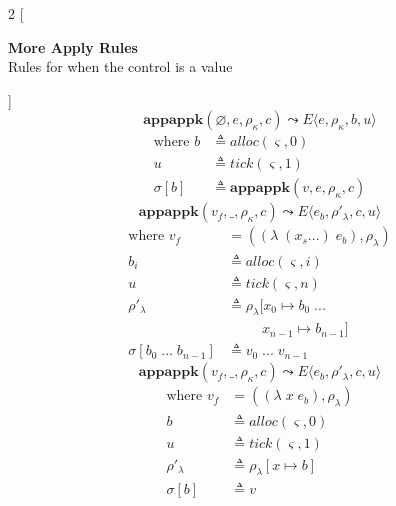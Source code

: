 \documentclass[12pt,draft]{article}
\newcommand{\lamsyn}[2]{(\lambda\;(#1 ...)\;#2)}
\newcommand{\vararglamsyn}[2]{(\lambda\;#1\;#2)}
\begin{document}

\begin{multicols*}{2}
[
\begin{center}
\textbf{More Apply Rules} \\
Rules for when the control is a value
\end{center}
]
\[
\textbf{appappk}(\varnothing, e, \rho_{\kappa}, c)
\leadsto
E\langle
e , \rho_{\kappa} , b , u
\rangle
\]
\vspace{-13mm}
\begin{align*}
\text{where } b &\triangleq alloc(\varsigma, 0) \\
u &\triangleq tick(\varsigma, 1) \\
\sigma[b] &\triangleq \textbf{appappk}(v, e, \rho_{\kappa}, c)
\end{align*}
\[
\textbf{appappk}(v_f,\_, \rho_{\kappa}, c)
\leadsto
E\langle
e_b , \rho'_{\lambda} , c , u
\rangle
\]
\vspace{-11mm}
\begin{align*}
\text{where } v_f &= (\lamsyn{x_s}{e_b}, \rho_{\lambda}) \\
b_i &\triangleq alloc(\varsigma, i) \\
u &\triangleq tick(\varsigma, n) \\
\rho'_{\lambda} &\triangleq \rho_{\lambda}[x_0 \mapsto b_0\; ... \\
&\;\;\;\;\;\;\;\;\;x_{n-1} \mapsto b_{n-1}] \\
\sigma[b_0\;...\; b_{n-1}] &\triangleq v_0\;...\;v_{n-1}
\end{align*}
\[
\textbf{appappk}(v_f,\_, \rho_{\kappa}, c)
\leadsto
E\langle
e_b , \rho'_{\lambda} , c , u
\rangle
\]
\vspace{-10.5mm}
\begin{align*}
\text{where } v_f &= (\vararglamsyn{x}{e_b}, \rho_{\lambda}) \\
b &\triangleq alloc(\varsigma, 0) \\
u &\triangleq tick(\varsigma, 1) \\
\rho'_{\lambda} &\triangleq \rho_{\lambda}[x \mapsto b] \\
\sigma[b] &\triangleq v
\end{align*}


\end{multicols*}
\end{document}

